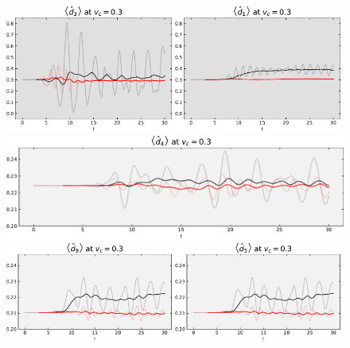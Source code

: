 \begin{figure}[!hbt]
{{\begin{minipage}[b]{.59\textwidth}
                \includegraphics[width=0.49\textwidth]{graph/double_occupation/double_occupation_vc_03_site_3.pdf}
                \includegraphics[width=0.49\textwidth]{graph/double_occupation/double_occupation_vc_03_site_1.pdf}
                \includegraphics[width=1.00\textwidth]{graph/double_occupation/double_occupation_vc_03_site_4.pdf}
                \includegraphics[width=0.49\textwidth]{graph/double_occupation/double_occupation_vc_03_site_9.pdf}
                \includegraphics[width=0.49\textwidth]{graph/double_occupation/double_occupation_vc_03_site_5.pdf}

\end{minipage}}}
\end{figure}
